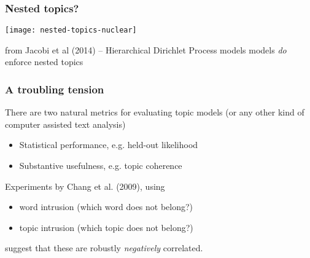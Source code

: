 \documentclass[11pt,compress,professionalfonts]{beamer}
\newcommand{\ita}{\begin{itemize}}
\newcommand{\itm}{\item[]}
\newcommand{\itz}{\end{itemize}}
\begin{document}
\begin{frame}[t,fragile]\frametitle{Nested topics?}

\centerline{\texttt{[image: nested-topics-nuclear]}}

from Jacobi et al (2014) -- Hierarchical Dirichlet Process models models \textit{do} enforce nested topics

\end{frame}
\begin{frame}[t,fragile]\frametitle{A troubling tension}

There are two natural metrics for evaluating topic models (or any other kind of computer assisted text analysis)
\ita
\itm Statistical performance, e.g. held-out likelihood
\itm Substantive usefulness, e.g. topic coherence
\itz
Experiments by Chang et al. (2009), using
\ita
\itm word intrusion (which word does not belong?)
\itm topic intrusion (which topic does not belong?)
\itz
suggest that these are robustly \textit{negatively} correlated.



%

%
%
%
%
%
%
%
%
%
%
%
%
%
%
%
%
%





\end{frame}
\end{document}

